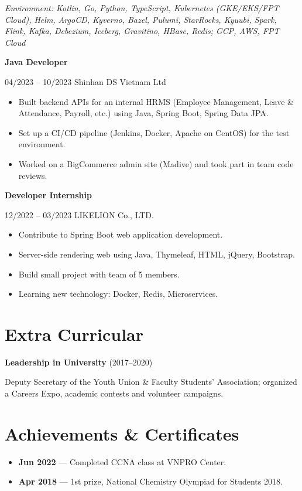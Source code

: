 \documentclass[10pt,a4paper]{article}
\newcommand{\role}[3]{%
  \textbf{#1}\par
  {\color{muted}\small #2 \textbullet{} #3}\par\vspace{2pt}}
\begin{document}
{\small\itshape Environment: Kotlin, Go, Python, TypeScript, Kubernetes (GKE/EKS/FPT Cloud), Helm, ArgoCD, Kyverno, Bazel, Pulumi, StarRocks, Kyuubi, Spark, Flink, Kafka, Debezium, Iceberg, Gravitino, HBase, Redis; GCP, AWS, FPT Cloud}

\smallskip
\role{Java Developer}{04/2023 -- 10/2023}{Shinhan DS Vietnam Ltd}
\begin{itemize}
  \item Built backend APIs for an internal HRMS (Employee Management, Leave \& Attendance, Payroll, etc.) using Java, Spring Boot, Spring Data JPA.
  \item Set up a CI/CD pipeline (Jenkins, Docker, Apache on CentOS) for the test environment.
  \item Worked on a BigCommerce admin site (Madive) and took part in team code reviews.
\end{itemize}

\role{Developer Internship}{12/2022 -- 03/2023}{LIKELION Co., LTD.}
\begin{itemize}
  \item Contribute to Spring Boot web application development.
  \item Server-side rendering web using Java, Thymeleaf, HTML, jQuery, Bootstrap.
  \item Build small project with team of 5 members.
  \item Learning new technology: Docker, Redis, Microservices.
\end{itemize}

\section{Extra Curricular}
\textbf{Leadership in University} {\color{muted}\small(2017--2020)}\par\smallskip
Deputy Secretary of the Youth Union \& Faculty Students' Association; organized a Careers Expo, academic contests and volunteer campaigns.

\section{Achievements \& Certificates}
\begin{itemize}[label=\textcolor{accent}{\faTrophy}]
  \item \textbf{Jun 2022} --- Completed CCNA class at VNPRO Center.
  \item \textbf{Apr 2018} --- 1st prize, National Chemistry Olympiad for Students 2018.
\end{itemize}
\end{document}
